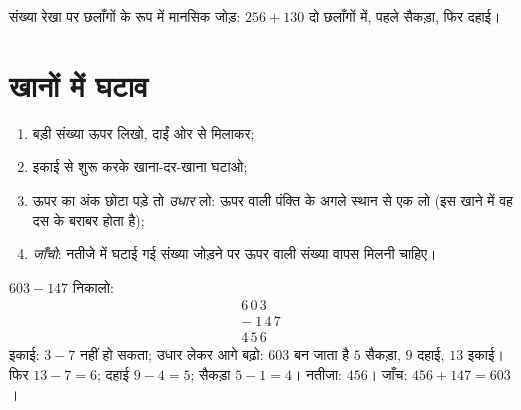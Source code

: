 \begin{omfigure}

{\small संख्या रेखा पर छलाँगों के रूप में मानसिक जोड़: $256 + 130$
दो छलाँगों में, पहले सैकड़ा, फिर दहाई।}
\end{omfigure}

\section{खानों में घटाव}

\begin{method}[खानों में घटाना]\label{met:g3:addsub:sub}
\begin{enumerate}
  \item बड़ी संख्या ऊपर लिखो, दाईं ओर से मिलाकर;
  \item इकाई से शुरू करके खाना-दर-खाना घटाओ;
  \item ऊपर का अंक छोटा पड़े तो \emph{उधार} लो: ऊपर वाली पंक्ति
        के अगले स्थान से एक लो (इस खाने में वह दस के बराबर
        होता है);
  \item \emph{जाँचो}: नतीजे में घटाई गई संख्या जोड़ने पर ऊपर
        वाली संख्या वापस मिलनी चाहिए।
\end{enumerate}
\end{method}

\begin{example}\label{ex:g3:addsub:sub}
$603 - 147$ निकालो:
\[
\begin{array}{r}
6\,0\,3 \\
-\ 1\,4\,7 \\
\hline
4\,5\,6
\end{array}
\]
इकाई: $3 - 7$ नहीं हो सकता; उधार लेकर आगे बढ़ो: $603$ बन जाता है
$5$ सैकड़ा, $9$ दहाई, $13$ इकाई। फिर $13 - 7 = 6$;
दहाई $9 - 4 = 5$; सैकड़ा $5 - 1 = 4$। नतीजा: $456$।
जाँच: $456 + 147 = 603$।
\end{example}

